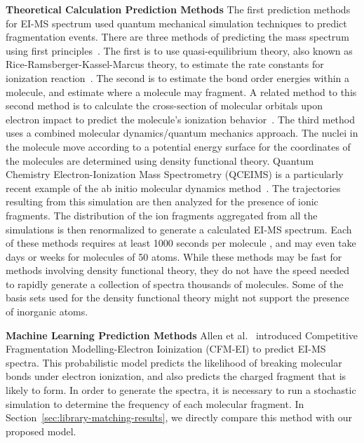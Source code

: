     
\textbf{Theoretical Calculation Prediction Methods} 
The first prediction methods for EI-MS spectrum used quantum mechanical simulation techniques to predict fragmentation events. There are three methods of predicting the mass spectrum using first principles~\cite{bauer2016compute}.
The first is to use quasi-equilibrium theory, also known as Rice-Ramsberger-Kassel-Marcus theory, to estimate the rate constants for ionization reaction~\cite{lorquet1994whither, lorquet2000landmarks, rosenstock1952absolute}.
The second is to estimate the bond order energies within a molecule, and estimate where a molecule may fragment. A related method to this second method is to calculate the cross-section of molecular orbitals upon electron impact to predict the molecule's ionization behavior~\cite{irikura2017ab, Guerra_BEB_model}.
The third method uses a combined molecular dynamics/quantum mechanics approach. The nuclei in the molecule move according to a potential energy surface for the coordinates of the molecules are determined using density functional theory. Quantum Chemistry Electron-Ionization Mass Spectrometry (QCEIMS) is a particularly recent example of the ab initio molecular dynamics method~\cite{grimme2013towards,Asgeirsson_QCEIMS,bauer2016compute}.
The trajectories resulting from this simulation are then analyzed for the presence of ionic fragments. The distribution of the ion fragments aggregated from all the simulations is then renormalized to generate a calculated EI-MS spectrum.
Each of these methods requires at least 1000 seconds per molecule \cite{allen2016computational}, and may even take days or weeks for molecules of 50 atoms. While these methods may be fast for methods involving density functional theory, they do not have the speed needed to rapidly generate a collection of spectra thousands of molecules. Some of the basis sets used for the density functional theory might not support the presence of inorganic atoms.
    
\textbf{Machine Learning Prediction Methods} Allen et al.~\cite{allen2016computational} introduced Competitive Fragmentation Modelling-Electron Ioinization (CFM-EI) to predict EI-MS spectra. This probabilistic model predicts the likelihood of breaking molecular bonds under electron ionization, and also predicts the charged fragment that is likely to form. In order to generate the spectra, it is necessary to run a stochastic simulation to determine the frequency of each molecular fragment.
In Section~\ref{sec:library-matching-results}, we directly compare this method with our proposed model.

